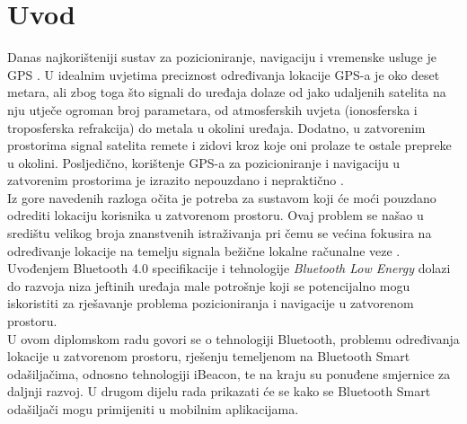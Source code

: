 \chapter{Uvod}

Danas najkorišteniji sustav za pozicioniranje, navigaciju i vremenske usluge je GPS . %
U idealnim uvjetima preciznost određivanja lokacije GPS-a je oko deset metara, ali zbog toga što signali do uređaja dolaze od jako udaljenih satelita na nju utječe ogroman broj parametara, od atmosferskih uvjeta (ionosferska i troposferska refrakcija) do metala u okolini uređaja. %
Dodatno, u zatvorenim prostorima signal satelita remete i zidovi kroz koje oni prolaze te ostale prepreke u okolini.
Posljedično, korištenje GPS-a za pozicioniranje i navigaciju u zatvorenim prostorima je izrazito nepouzdano i nepraktično \citep{schneider2013}.
\\

Iz gore navedenih razloga očita je potreba za sustavom koji će moći pouzdano odrediti lokaciju korisnika u zatvorenom prostoru. 
Ovaj problem se našao u središtu velikog broja znanstvenih istraživanja pri čemu se većina fokusira na određivanje lokacije na temelju signala bežične lokalne računalne veze . %
Uvođenjem Bluetooth 4.0 specifikacije i tehnologije \textit{Bluetooth Low Energy} dolazi do razvoja niza jeftinih uređaja male potrošnje koji se potencijalno mogu iskoristiti za rješavanje problema pozicioniranja i navigacije u zatvorenom prostoru.
\\

U ovom diplomskom radu govori se o tehnologiji Bluetooth, problemu određivanja lokacije u zatvorenom prostoru, rješenju temeljenom na Bluetooth Smart odašiljačima, odnosno tehnologiji iBeacon, te na kraju su ponuđene smjernice za daljnji razvoj. 
U drugom dijelu rada prikazati će se kako se Bluetooth Smart odašiljači mogu primijeniti u mobilnim aplikacijama.